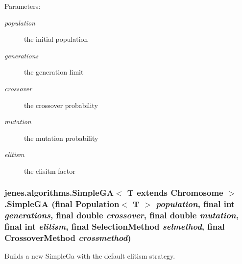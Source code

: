 \begin{Desc}
\item[Parameters:]
\begin{description}
\item[{\em population}]the initial population \item[{\em generations}]the generation limit \item[{\em crossover}]the crossover probability \item[{\em mutation}]the mutation probability \item[{\em elitism}]the elisitm factor \end{description}
\end{Desc}
\hypertarget{classjenes_1_1algorithms_1_1_simple_g_a_3_01_t_01extends_01_chromosome_01_4_c23644006d7eb399fd4d26e77da8826d}{
\subsubsection[SimpleGA]{\setlength{\rightskip}{0pt plus 5cm}jenes.algorithms.SimpleGA$<$ T extends Chromosome $>$.SimpleGA (final Population$<$ T $>$ {\em population}, \/  final int {\em generations}, \/  final double {\em crossover}, \/  final double {\em mutation}, \/  final int {\em elitism}, \/  final {\bf SelectionMethod} {\em selmethod}, \/  final {\bf CrossoverMethod} {\em crossmethod})}}
\label{classjenes_1_1algorithms_1_1_simple_g_a_3_01_t_01extends_01_chromosome_01_4_c23644006d7eb399fd4d26e77da8826d}


Builds a new SimpleGa with the default elitism strategy. 

